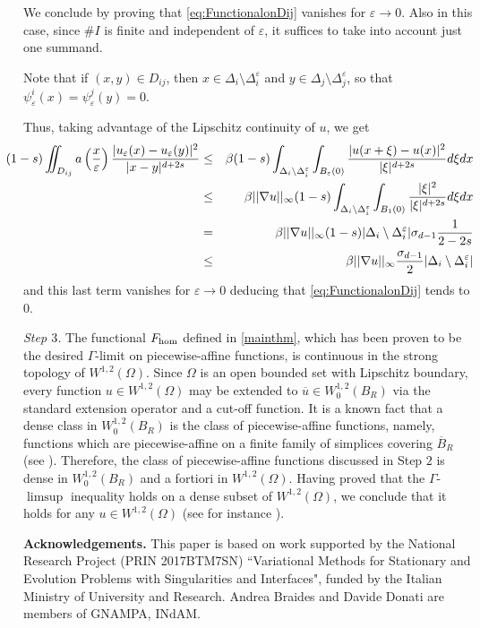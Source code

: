 \documentclass[11pt,a4paper,reqno]{amsart}
\theoremstyle{plain}
\theoremstyle{definition}
\newcommand\e{\varepsilon}
\newcommand\Omi{\Delta_i^{\varepsilon}}
\theoremstyle{remark}
\begin{document}
\smallskip

We conclude by proving that \eqref{eq:FunctionalonDij} vanishes for $\e\to 0$. Also in this case, since $\#I$ is finite and independent of $\e$, it suffices to take into account just one summand.

Note that if $(x,y)\in D_{ij}$, then $x\in\Delta_i\setminus{\Omi}$ and $y\in\Delta_j\setminus\Delta_j^{\e}$, so that $\psi^i_\e(x)=\psi^j_\e(y)=0.$ 

\noindent Thus, taking advantage of the Lipschitz continuity of $u$, we get
\begin{eqnarray*} \nonumber
    \hspace{-0.5 cm}(1-s)\iint_{D_{ij}}a\left(\frac{x}{\e}\right)\frac{\lvert u_\e(x)-u_\e(y)\rvert^2}{\lvert x-y\rvert^{d+2s}} &\leq& \beta(1-s)\int_{\Delta_i\setminus{\Omi}}\int_{B_{\e}(0)}\frac{\lvert u(x+\xi)-u(x)\rvert^2}{\lvert\xi\rvert^{d+2s}}d\xi dx \\
 &\leq& \beta\lvert\lvert\nabla{u}\rvert\rvert_\infty(1-s)\int_{\Delta_i\setminus{\Omi}}\int_{B_{1}(0)}\frac{\lvert\xi\rvert^2}{\lvert\xi\rvert^{d+2s}}d\xi dx\\
 &=& \beta\lvert\lvert\nabla{u}\rvert\rvert_\infty(1-s) |\Delta_i\setminus{\Omi}| \sigma_{d-1} \frac{1}{2-2s} \\
 &\leq& \beta\lvert\lvert\nabla{u}\rvert\rvert_\infty\frac{\sigma_{d-1}}{2} |\Delta_i\setminus{\Omi}|
\end{eqnarray*}
and this last term vanishes for $\e \to 0$ deducing that \eqref{eq:FunctionalonDij} tends to $0$.

\smallskip

\textit{Step $3$.} The functional $F_{\rm\hom}$ defined in \eqref{mainthm}, which has been proven to be the desired $\Gamma$-limit on piecewise-affine functions, is continuous in the strong topology of $W^{1,2}(\Omega)$. Since $\Omega$ is an open bounded set with Lipschitz boundary, 
every function $u\in W^{1,2}(\Omega)$ may be extended to $\overline{u}\in W^{1,2}_0(B_R)$ via the standard extension operator and a cut-off function.
It is a known fact that a dense class in $W^{1,2}_0(B_R)$ is the class of piecewise-affine functions, namely, functions which are piecewise-affine on a finite family of simplices covering $\overline{B}_R$ (see \cite[Proposition 2.1]{EkelandConvex}). Therefore, the class of piecewise-affine functions discussed in Step $2$ is dense in $W^{1,2}_0(B_R)$ and a fortiori in $W^{1,2}(\Omega)$. Having proved that the $\Gamma$-$\limsup$ inequality holds on a dense subset of $W^{1,2}(\Omega)$, we conclude that it holds for any $u\in W^{1,2}(\Omega)$ (see for instance \cite[Remark 2.8]{handbook}).

\medskip
\noindent \textbf{Acknowledgements.}
 This paper is based on work supported by the National Research Project (PRIN  2017BTM7SN) 
 ``Variational Methods for Stationary and Evolution Problems with Singularities and 
 Interfaces", funded by the Italian Ministry of University and Research. 
Andrea Braides and Davide Donati are members of GNAMPA, INdAM.



\end{document}
